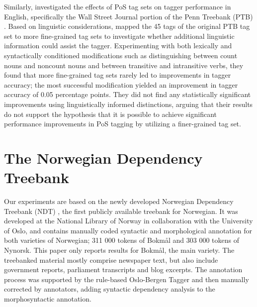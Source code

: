 \documentclass[11pt,a4paper]{article}
\begin{document}
Similarly,  investigated the effects of PoS tag sets on tagger
performance in English, specifically the Wall Street Journal portion of the
Penn Treebank (PTB) \cite{Mar:San:Mar:93}. Based on linguistic considerations,
 mapped the 45 tags of the original PTB tag set to more
fine-grained tag sets to investigate whether additional linguistic information
could assist the tagger. Experimenting with both lexically and syntactically
conditioned modifications such as distinguishing between count nouns and
noncount nouns and between transitive and intransitive verbs, they found that
more fine-grained tag sets rarely led to improvements in tagger accuracy; the
most successful modification yielded an improvement in tagger accuracy of 0.05
percentage points.  They did not find any statistically significant
improvements using linguistically informed distinctions, arguing that their
results do not support the hypothesis that it is possible to achieve
significant performance improvements in PoS tagging by utilizing a
finer-grained tag set.


\section{The Norwegian Dependency Treebank}
\label{sec:data}
Our experiments are based on the newly developed Norwegian Dependency Treebank
(NDT) \cite{Sol:Skj:Ovr:14}, the first publicly available treebank for
Norwegian. It was developed at the National Library of Norway in collaboration
with the University of Oslo, and contains manually coded syntactic and
morphological annotation for both varieties of Norwegian; 311 000 tokens of
Bokmål and 303 000 tokens of Nynorsk. This paper only reports results for
Bokmål, the main variety. The treebanked material mostly comprise newspaper
text, but also include government reports, parliament transcripts and blog
excerpts. The annotation process was supported by the rule-based Oslo-Bergen
Tagger \cite{Hag:Joh:Nok:00} and then manually corrected by annotators, adding
syntactic dependency analysis to the morphosyntactic annotation.
\end{document}
